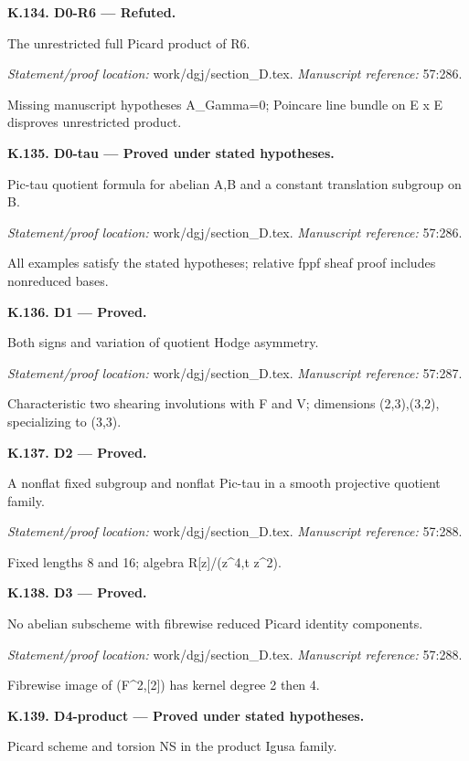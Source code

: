 \par\medskip\noindent\textbf{K.134. D0-R6 --- Refuted.}\par
The unrestricted full Picard product of R6.
\par\emph{Statement/proof location:} work/dgj/section\_D.tex.
\emph{Manuscript reference:} 57:286.
\par Missing manuscript hypotheses A\_Gamma=0; Poincare line bundle on E x E disproves unrestricted product.
\par\medskip\noindent\textbf{K.135. D0-tau --- Proved under stated hypotheses.}\par
Pic-tau quotient formula for abelian A,B and a constant translation subgroup on B.
\par\emph{Statement/proof location:} work/dgj/section\_D.tex.
\emph{Manuscript reference:} 57:286.
\par All examples satisfy the stated hypotheses; relative fppf sheaf proof includes nonreduced bases.
\par\medskip\noindent\textbf{K.136. D1 --- Proved.}\par
Both signs and variation of quotient Hodge asymmetry.
\par\emph{Statement/proof location:} work/dgj/section\_D.tex.
\emph{Manuscript reference:} 57:287.
\par Characteristic two shearing involutions with F and V; dimensions (2,3),(3,2), specializing to (3,3).
\par\medskip\noindent\textbf{K.137. D2 --- Proved.}\par
A nonflat fixed subgroup and nonflat Pic-tau in a smooth projective quotient family.
\par\emph{Statement/proof location:} work/dgj/section\_D.tex.
\emph{Manuscript reference:} 57:288.
\par Fixed lengths 8 and 16; algebra R[z]/(z\textasciicircum{}4,t z\textasciicircum{}2).
\par\medskip\noindent\textbf{K.138. D3 --- Proved.}\par
No abelian subscheme with fibrewise reduced Picard identity components.
\par\emph{Statement/proof location:} work/dgj/section\_D.tex.
\emph{Manuscript reference:} 57:288.
\par Fibrewise image of (F\textasciicircum{}2,[2]) has kernel degree 2 then 4.
\par\medskip\noindent\textbf{K.139. D4-product --- Proved under stated hypotheses.}\par
Picard scheme and torsion NS in the product Igusa family.
